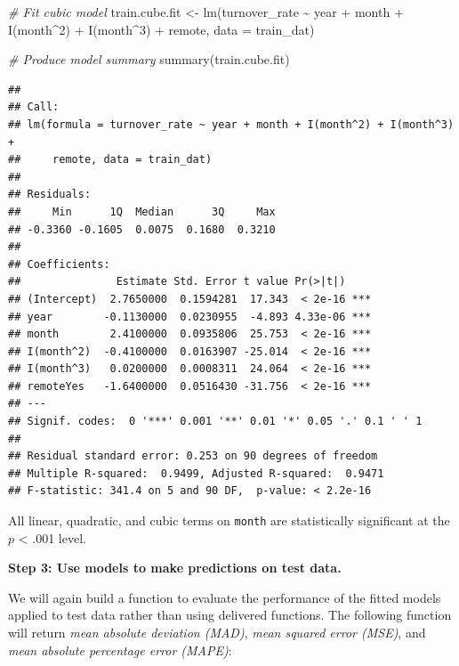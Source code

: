 \documentclass[
]{book}
\newenvironment{Shaded}{\begin{snugshade}}{\end{snugshade}}
\newcommand{\AttributeTok}[1]{\textcolor[rgb]{0.77,0.63,0.00}{#1}}
\newcommand{\CommentTok}[1]{\textcolor[rgb]{0.56,0.35,0.01}{\textit{#1}}}
\newcommand{\DecValTok}[1]{\textcolor[rgb]{0.00,0.00,0.81}{#1}}
\newcommand{\FunctionTok}[1]{\textcolor[rgb]{0.00,0.00,0.00}{#1}}
\newcommand{\NormalTok}[1]{#1}
\newcommand{\OtherTok}[1]{\textcolor[rgb]{0.56,0.35,0.01}{#1}}
\newcommand{\SpecialCharTok}[1]{\textcolor[rgb]{0.00,0.00,0.00}{#1}}
\begin{document}
\begin{Shaded}
\begin{Highlighting}[]
\CommentTok{\# Fit cubic model}
\NormalTok{train.cube.fit }\OtherTok{\textless{}{-}} \FunctionTok{lm}\NormalTok{(turnover\_rate }\SpecialCharTok{\textasciitilde{}}\NormalTok{ year }\SpecialCharTok{+}\NormalTok{ month }\SpecialCharTok{+} \FunctionTok{I}\NormalTok{(month}\SpecialCharTok{\^{}}\DecValTok{2}\NormalTok{) }\SpecialCharTok{+} \FunctionTok{I}\NormalTok{(month}\SpecialCharTok{\^{}}\DecValTok{3}\NormalTok{) }\SpecialCharTok{+}\NormalTok{ remote, }\AttributeTok{data =}\NormalTok{ train\_dat)}

\CommentTok{\# Produce model summary}
\FunctionTok{summary}\NormalTok{(train.cube.fit)}
\end{Highlighting}
\end{Shaded}

\begin{verbatim}
## 
## Call:
## lm(formula = turnover_rate ~ year + month + I(month^2) + I(month^3) + 
##     remote, data = train_dat)
## 
## Residuals:
##     Min      1Q  Median      3Q     Max 
## -0.3360 -0.1605  0.0075  0.1680  0.3210 
## 
## Coefficients:
##               Estimate Std. Error t value Pr(>|t|)    
## (Intercept)  2.7650000  0.1594281  17.343  < 2e-16 ***
## year        -0.1130000  0.0230955  -4.893 4.33e-06 ***
## month        2.4100000  0.0935806  25.753  < 2e-16 ***
## I(month^2)  -0.4100000  0.0163907 -25.014  < 2e-16 ***
## I(month^3)   0.0200000  0.0008311  24.064  < 2e-16 ***
## remoteYes   -1.6400000  0.0516430 -31.756  < 2e-16 ***
## ---
## Signif. codes:  0 '***' 0.001 '**' 0.01 '*' 0.05 '.' 0.1 ' ' 1
## 
## Residual standard error: 0.253 on 90 degrees of freedom
## Multiple R-squared:  0.9499, Adjusted R-squared:  0.9471 
## F-statistic: 341.4 on 5 and 90 DF,  p-value: < 2.2e-16
\end{verbatim}

All linear, quadratic, and cubic terms on \texttt{month} are statistically significant at the \(p\) \textless{} .001 level.

\textbf{Step 3: Use models to make predictions on test data.}

We will again build a function to evaluate the performance of the fitted models applied to test data rather than using delivered functions. The following function will return \emph{mean absolute deviation (MAD)}, \emph{mean squared error (MSE)}, and \emph{mean absolute percentage error (MAPE)}:
\end{document}
